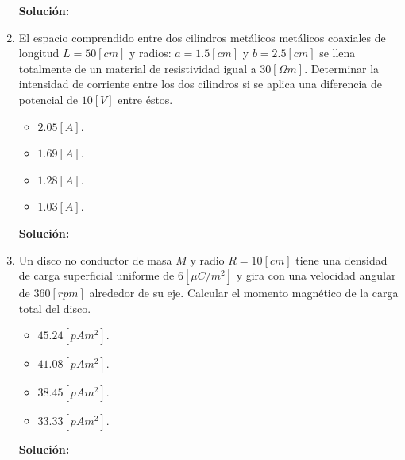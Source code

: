 \documentclass[letter,11pt]{article}
\begin{document}
\begin{enumerate}
\textbf{Solución:}

\item El espacio comprendido entre dos cilindros metálicos metálicos coaxiales
de longitud $L = 50 [cm]$ y radios: $a = 1.5 [cm]$ y $b = 2.5 [cm]$ se llena
totalmente de un material de resistividad igual a $30 [\Omega m]$. Determinar la
intensidad de corriente entre los dos cilindros si se aplica una diferencia de
potencial de $10 [V]$ entre éstos.

\begin{itemize}
    \item $2.05 [A]$.
    \item $1.69 [A]$.
    \item $1.28 [A]$.
    \item $1.03 [A]$.
\end{itemize}

\textbf{Solución:}

\item Un disco no conductor de masa $M$ y radio $R = 10 [cm]$ tiene una densidad
de carga superficial uniforme de $6 [\mu C/m^2]$ y gira con una velocidad
angular de $360 [rpm]$ alrededor de su eje. Calcular el momento magnético de la
carga total del disco.

\begin{itemize}
    \item $45.24 [pA m^2]$.
    \item $41.08 [pA m^2]$.
    \item $38.45 [pA m^2]$.
    \item $33.33 [pA m^2]$.
\end{itemize}

\textbf{Solución:}

\end{enumerate}
\end{document}
